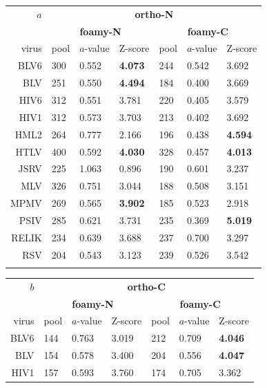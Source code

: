 \documentclass{bmcart}
\begin{document}
\begin{table}
\centering
\begin{tabular}{r|lll|lll|}
$a$  & \multicolumn{6}{c|}{\bf ortho-N} \\
     & \multicolumn{3}{c|}{\bf foamy-N} & \multicolumn{3}{c|}{\bf foamy-C}  \\
\hline \hline
virus  & pool & $a$-value & Z-score & pool & $a$-value & Z-score \\
\hline
BLV6   &  300  & 0.552 & {\bf 4.073} &  244  & 0.542 &      3.692  \\
BLV    &  251  & 0.550 & {\bf 4.494} &  184  & 0.400 &      3.669  \\
HIV6   &  312  & 0.551 &      3.781  &  220  & 0.405 &      3.579  \\
HIV1   &  312  & 0.573 &      3.703  &  213  & 0.402 &      3.692  \\
HML2   &  264  & 0.777 &      2.166  &  196  & 0.438 & {\bf 4.594} \\
HTLV   &  400  & 0.592 & {\bf 4.030} &  328  & 0.457 & {\bf 4.013} \\
JSRV   &  225  & 1.063 &      0.896  &  190  & 0.601 &      3.237  \\
MLV    &  326  & 0.751 &      3.044  &  188  & 0.508 &      3.151  \\
MPMV   &  269  & 0.565 & {\bf 3.902} &  185  & 0.523 &      2.918  \\
PSIV   &  285  & 0.621 &      3.731  &  235  & 0.369 & {\bf 5.019} \\
RELIK  &  234  & 0.639 &      3.688  &  237  & 0.700 &      3.297  \\
RSV    &  204  & 0.543 &      3.123  &  239  & 0.526 &      3.542  \\
\hline \hline
\vspace{10pt}
\end{tabular}
\begin{tabular}{r|lll|lll|}
$b$  & \multicolumn{6}{c|}{\bf ortho-C} \\
     & \multicolumn{3}{c|}{\bf foamy-N} & \multicolumn{3}{c|}{\bf foamy-C}  \\
\hline \hline
virus  & pool & $a$-value & Z-score & pool & $a$-value & Z-score \\
\hline
BLV6   &  144  & 0.763 &      3.019  &  212  & 0.709 & {\bf 4.046} \\
BLV    &  154  & 0.578 &      3.400  &  204  & 0.556 & {\bf 4.047} \\
HIV1   &  157  & 0.593 &      3.760  &  174  & 0.705 &      3.362  \\

\end{tabular}
\end{table}
\end{document}
